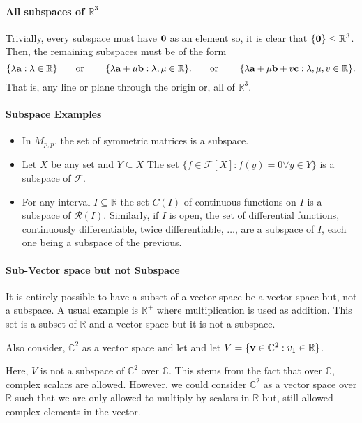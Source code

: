 \paragraph{All subspaces of \(\mathbb{R}^3\)}
Trivially, every subspace must have \(\mathbf{0}\) as an element so,
it is clear that \(\{\mathbf{0}\} \leq \mathbb{R}^3\).
Then, the remaining subspaces must be of the form
\[
    \{\lambda \mathbf{a} : \lambda\in \mathbb{R} \}
    \quad \text{\quad or \quad} \quad
    \{\lambda \mathbf{a} + \mu \mathbf{b}: \lambda, \mu \in \mathbb{R} \}.
    \quad \text{\quad or \quad} \quad
    \{\lambda \mathbf{a} + \mu \mathbf{b} + v\mathbf{c}: \lambda, \mu, v\in \mathbb{R} \}.
\]
That is, any line or plane through the origin or, all of \(\mathbb{R}^3\).

\paragraph{Subspace Examples}
\begin{itemize}
    \item In \(M_{p, p}\), the set of symmetric matrices is a subspace.
    \item Let \(X\)  be any set and \(Y\subseteq X\)
    The set \(
        \{
            f\in \mathcal{F}[X] : f(y) = 0 \forall y\in Y
        \}
    \) is a subspace of \(\mathcal{F}\).
    \item For any interval \(I\subseteq \mathbb{R}\) the set \(C(I)\)
    of continuous functions on \(I\) is a subspace of \(\mathcal{R}(I)\).
    Similarly, if \(I\) is open, the set of differential functions,
    continuously differentiable, twice differentiable, \(\dots\), 
    are a subspace of \(I\), each one being a subspace of the previous.
\end{itemize}

\paragraph{Sub-Vector space but not Subspace}
It is entirely possible to have a subset of a vector space be a vector space
but, not a subspace. A usual example is \(\mathbb{R}^{+}\) where multiplication
is used as addition. This set is a subset of \(\mathbb{R}\) and a vector
space but it is not a subspace.

Also consider, \(\mathbb{C}^2\) as a vector space and let and let 
\(V = \{
    \mathbf{v} \in \mathbb{C}^2 : v_1 \in \mathbb{R}
\}\).

Here, \(V\) is not a subspace of \(\mathbb{C}^2\) over \(\mathbb{C}\).
This stems from the fact that over \(\mathbb{C}\), complex scalars are
allowed. However, we could consider \(\mathbb{C}^2\) as a vector space over
\(\mathbb{R}\) such that we are only allowed to multiply by scalars in
\(\mathbb{R}\) but, still allowed complex elements in the vector.


